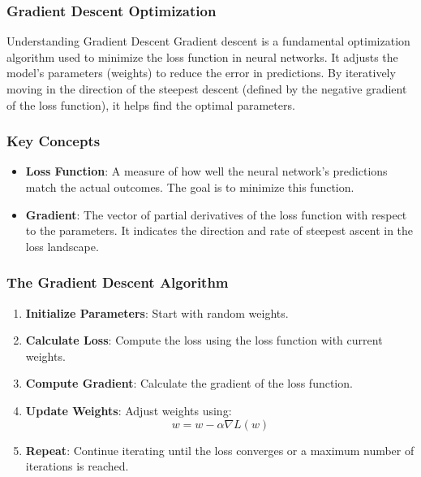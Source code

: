\documentclass[aspectratio=169]{beamer}
\begin{document}
\begin{frame}[fragile]
    \frametitle{Gradient Descent Optimization}
    \begin{block}{Understanding Gradient Descent}
        Gradient descent is a fundamental optimization algorithm used to minimize the loss function in neural networks. It adjusts the model's parameters (weights) to reduce the error in predictions. By iteratively moving in the direction of the steepest descent (defined by the negative gradient of the loss function), it helps find the optimal parameters.
    \end{block}
\end{frame}

\begin{frame}[fragile]
    \frametitle{Key Concepts}
    \begin{itemize}
        \item \textbf{Loss Function}: A measure of how well the neural network's predictions match the actual outcomes. The goal is to minimize this function.
        \item \textbf{Gradient}: The vector of partial derivatives of the loss function with respect to the parameters. It indicates the direction and rate of steepest ascent in the loss landscape.
    \end{itemize}
\end{frame}

\begin{frame}[fragile]
    \frametitle{The Gradient Descent Algorithm}
    \begin{enumerate}
        \item \textbf{Initialize Parameters}: Start with random weights.
        \item \textbf{Calculate Loss}: Compute the loss using the loss function with current weights.
        \item \textbf{Compute Gradient}: Calculate the gradient of the loss function.
        \item \textbf{Update Weights}: Adjust weights using:
            \begin{equation}
            w = w - \alpha \nabla L(w)
            \end{equation}
        \item \textbf{Repeat}: Continue iterating until the loss converges or a maximum number of iterations is reached.
    \end{enumerate}
\end{frame}
\end{document}
